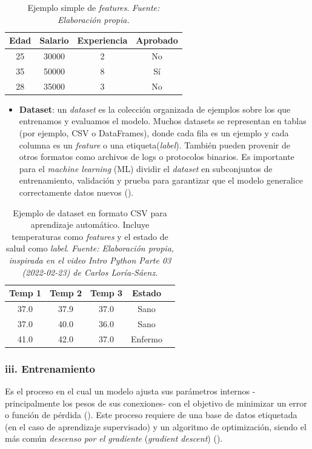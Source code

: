 \documentclass[11pt]{article} %
\begin{document}
\begin{table}[h]
\centering
\caption{Ejemplo simple de \textit{features}. \textit{Fuente: Elaboración propia.}}

\label{tab:simple_features}
\begin{tabular}{|c|c|c|c|}
\hline
\textbf{Edad} & \textbf{Salario} & \textbf{Experiencia} & \textbf{Aprobado} \\
\hline
25 & 30000 & 2 & No \\
\hline
35 & 50000 & 8 & Sí \\
\hline
28 & 35000 & 3 & No \\
\hline
\end{tabular}
\end{table}

\begin{itemize}
    \item \textbf{Dataset}: un \textit{dataset} es la colección organizada de ejemplos sobre los que entrenamos y evaluamos el modelo. Muchos datasets se representan en tablas (por ejemplo, CSV o DataFrames), donde cada fila es un ejemplo y cada columna es un \textit{feature} o una etiqueta(\textit{label}). También pueden provenir de otros formatos como archivos de logs o protocolos binarios. Es importante para el \textit{machine learning} (ML) dividir el \textit{dataset} en subconjuntos de entrenamiento, validación y prueba para garantizar que el modelo generalice correctamente datos nuevos (\cite{googleML2025}).
\end{itemize}

\begin{table}[h]
\centering
\caption{Ejemplo de dataset en formato CSV para aprendizaje automático. Incluye temperaturas como \textit{features} y el estado de salud como \textit{label}. \textit{Fuente: Elaboración propia, inspirada en el video \textit{Intro Python Parte 03 (2022-02-23)} de Carlos Loría-Sáenz.}}

\label{tab:ml_dataset_example}
\begin{tabular}{|c|c|c|c|c|}
\hline
\textbf{Temp 1} & \textbf{Temp 2} & \textbf{Temp 3} & \textbf{Estado} \\
\hline
37.0 & 37.9 & 37.0 & Sano \\
37.0 & 40.0 & 36.0 & Sano \\
41.0 & 42.0 & 37.0 & Enfermo \\
\hline
\end{tabular}
\end{table}
\vspace{8pt}
\subsubsection{iii. Entrenamiento}
Es el proceso en el cual un modelo ajusta sus parámetros internos -principalmente los pesos de sus conexiones- con el objetivo de minimizar un error o función de pérdida (\cite{nvidia}). Este proceso requiere de una base de datos etiquetada (en el caso de aprendizaje supervisado) y un algoritmo de optimización, siendo el más común \textit{descenso por el gradiente} (\textit{gradient descent}) (\cite{sanchez}).
\end{document}

